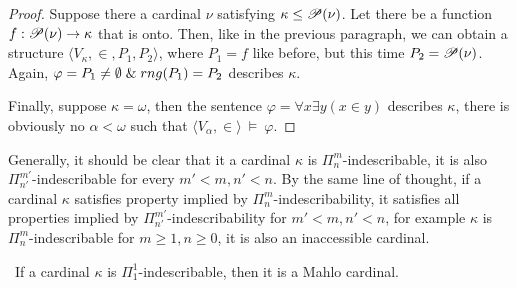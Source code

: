 \begin{proof}
Suppose there a cardinal $\nu$ satisfying $\kappa \leq \mathscr{P} (\nu)$. Let there be a function $f: \mathscr{P} (\nu) \rightarrow \kappa$ that is onto. Then, like in the previous paragraph, we can obtain a structure $\langle V_\kappa, \in, P_1, P_2 \rangle$, where $P_1 = f$ like before, but this time $P_2 = \mathscr{P} (\nu)$. Again, $\varphi = P_1 \neq \emptyset \mathrel{\&} rng(P_1) = P_2$ describes $\kappa$.

Finally, suppose $\kappa = \omega$, then the sentence $\varphi = \forall x \exists y (x \in y)$ describes $\kappa$, 
there is obviously no $\alpha < \omega$ such that $\langle V_\alpha, \in \rangle~\models~\varphi$.

\end{proof}

Generally, it should be clear that it a cardinal $\kappa$ is $\Pi^m_n$-indescribable, it is also $\Pi^{m'}_{n'}$-indescribable for every $m'<m, n'<n$. By the same line of thought, if a cardinal $\kappa$ satisfies property implied by $\Pi^m_n$-indescribability, it satisfies all properties implied by $\Pi^{m'}_{n'}$-indescribability for $m'<m, n'<n$, for example $\kappa$ is $\Pi^m_n$-indescribable for $m \geq 1, n \geq 0$, it is also an inaccessible cardinal.


\begin{theorem}\
If a cardinal $\kappa$ is $\Pi^1_1$-indescribable, then it is a Mahlo cardinal.
\end{theorem}

